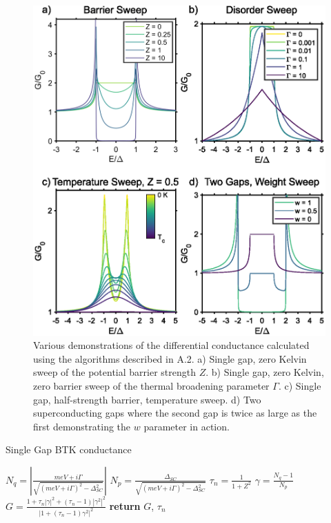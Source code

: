 \begin{figure}
    \centering
    \includegraphics[width=\textwidth]{Appendices/Figures/BTKCalculations.eps}
    \caption{Various demonstrations of the differential conductance calculated using the algorithms described in A.2. a) Single gap, zero Kelvin sweep of the potential barrier strength $Z$. b) Single gap, zero Kelvin, zero barrier sweep of the thermal broadening parameter $\Gamma$. c) Single gap, half-strength barrier, temperature sweep. d) Two superconducting gaps where the second gap is twice as large as the first demonstrating the $w$ parameter in action.}
    \label{fig:BTKGraphs}
\end{figure}
\begin{algorithm}
\caption{Single Gap \ac{BTK} conductance}\label{zeroT}
\begin{algorithmic}[1]
\State $N_{q}=\left|\frac{meV+i\Gamma}{\sqrt{(meV+i\Gamma)^{2}-\Delta_{SC}^{2}}}\right|$
\State $N_{p}=\frac{\Delta_{SC}}{\sqrt{(meV+i\Gamma)^{2}-\Delta_{SC}^{2}}} $
\State $\tau_{n} = \frac{1}{1+Z^{2}}$
\State $\gamma = \frac{N_{q}-1}{N_{p}}$
\State $G = \frac{1+\tau_{n}\left|\gamma\right|^{2}+\left(\tau_{n}-1\right)\left|\gamma^{2}\right|^{2}}{\left|1+\left(\tau_{n}-1\right)\gamma^{2}\right|^{2}}$
\State \textbf{return} $G$, $\tau_{n}$
\EndFunction
\end{algorithmic}
\end{algorithm}
